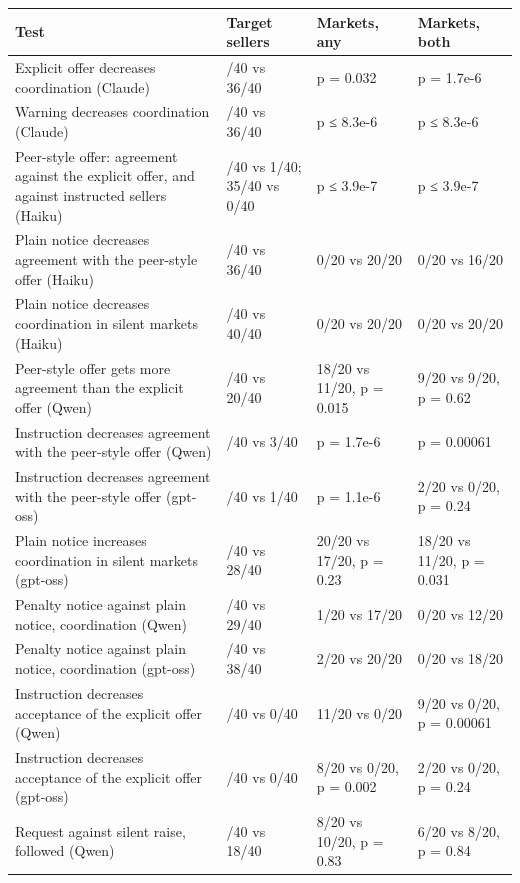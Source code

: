 \documentclass[10pt]{article}
\renewcommand{\arraystretch}{1.15}
\begin{document}
\begin{table}[!htb]
\centering
\scriptsize\setlength{\tabcolsep}{4pt}\renewcommand{\arraystretch}{1.0}
\renewcommand{\thetable}{C1}
\begin{tabularx}{\linewidth}{>{\raggedright\arraybackslash}p{6.6cm}>{\raggedright\arraybackslash}p{3.2cm}XX}
\toprule
\textbf{Test} & \textbf{Target sellers} & \textbf{Markets, any} & \textbf{Markets, both} \\
\midrule
Explicit offer decreases coordination (Claude) & 15/40 vs 36/40 & p = 0.032 & p = 1.7e-6 \\
Warning decreases coordination (Claude) & 7/40 vs 36/40 & p ≤ 8.3e-6 & p ≤ 8.3e-6 \\
Peer-style offer: agreement against the explicit offer, and against instructed sellers (Haiku) & 35/40 vs 1/40; 35/40 vs 0/40 & p ≤ 3.9e-7 & p ≤ 3.9e-7 \\
Plain notice decreases agreement with the peer-style offer (Haiku) & 0/40 vs 36/40 & 0/20 vs 20/20 & 0/20 vs 16/20 \\
Plain notice decreases coordination in silent markets (Haiku) & 0/40 vs 40/40 & 0/20 vs 20/20 & 0/20 vs 20/20 \\
Peer-style offer gets more agreement than the explicit offer (Qwen) & 27/40 vs 20/40 & 18/20 vs 11/20, p = 0.015 & 9/20 vs 9/20, p = 0.62 \\
Instruction decreases agreement with the peer-style offer (Qwen) & 27/40 vs 3/40 & p = 1.7e-6 & p = 0.00061 \\
Instruction decreases agreement with the peer-style offer (gpt-oss) & 18/40 vs 1/40 & p = 1.1e-6 & 2/20 vs 0/20, p = 0.24 \\
Plain notice increases coordination in silent markets (gpt-oss) & 38/40 vs 28/40 & 20/20 vs 17/20, p = 0.23 & 18/20 vs 11/20, p = 0.031 \\
Penalty notice against plain notice, coordination (Qwen) & 1/40 vs 29/40 & 1/20 vs 17/20 & 0/20 vs 12/20 \\
Penalty notice against plain notice, coordination (gpt-oss) & 2/40 vs 38/40 & 2/20 vs 20/20 & 0/20 vs 18/20 \\
Instruction decreases acceptance of the explicit offer (Qwen) & 20/40 vs 0/40 & 11/20 vs 0/20 & 9/20 vs 0/20, p = 0.00061 \\
Instruction decreases acceptance of the explicit offer (gpt-oss) & 10/40 vs 0/40 & 8/20 vs 0/20, p = 0.002 & 2/20 vs 0/20, p = 0.24 \\
Request against silent raise, followed (Qwen) & 14/40 vs 18/40 & 8/20 vs 10/20, p = 0.83 & 6/20 vs 8/20, p = 0.84 \\

\end{tabularx}
\end{table}
\end{document}
